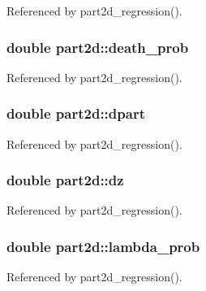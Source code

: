 Referenced by part2d\+\_\+regression().

\subsubsection[{\texorpdfstring{death\+\_\+prob}{death_prob}}]{\setlength{\rightskip}{0pt plus 5cm}double part2d\+::death\+\_\+prob}\hypertarget{structpart2d_a98ff4f5abc34ced0dd16fe2627347488}{}\label{structpart2d_a98ff4f5abc34ced0dd16fe2627347488}


Referenced by part2d\+\_\+regression().

\subsubsection[{\texorpdfstring{dpart}{dpart}}]{\setlength{\rightskip}{0pt plus 5cm}double part2d\+::dpart}\hypertarget{structpart2d_a5bebab97b87fb0a05ef69c3d9519efc0}{}\label{structpart2d_a5bebab97b87fb0a05ef69c3d9519efc0}


Referenced by part2d\+\_\+regression().

\subsubsection[{\texorpdfstring{dz}{dz}}]{\setlength{\rightskip}{0pt plus 5cm}double part2d\+::dz}\hypertarget{structpart2d_a6d20d14137cf33ceac2ee605909f7271}{}\label{structpart2d_a6d20d14137cf33ceac2ee605909f7271}


Referenced by part2d\+\_\+regression().

\subsubsection[{\texorpdfstring{lambda\+\_\+prob}{lambda_prob}}]{\setlength{\rightskip}{0pt plus 5cm}double part2d\+::lambda\+\_\+prob}\hypertarget{structpart2d_af4bbaff518db334c7942c7d3a18a487d}{}\label{structpart2d_af4bbaff518db334c7942c7d3a18a487d}


Referenced by part2d\+\_\+regression().

